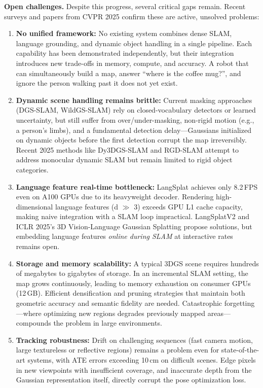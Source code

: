 \documentclass[10pt,twocolumn,letterpaper]{article}
\begin{document}
\textbf{Open challenges.} Despite this progress, several critical gaps remain. Recent surveys \cite{tosi2025survey, ding2025survey} and papers from CVPR 2025 confirm these are active, unsolved problems:
\begin{enumerate}
    \item \textbf{No unified framework:} No existing system combines dense SLAM, language grounding, and dynamic object handling in a single pipeline. Each capability has been demonstrated independently, but their integration introduces new trade-offs in memory, compute, and accuracy. A robot that can simultaneously build a map, answer ``where is the coffee mug?'', and ignore the person walking past it does not yet exist.

    \item \textbf{Dynamic scene handling remains brittle:} Current masking approaches (DGS-SLAM, WildGS-SLAM) rely on closed-vocabulary detectors or learned uncertainty, but still suffer from over/under-masking, non-rigid motion (e.g., a person's limbs), and a fundamental detection delay---Gaussians initialized on dynamic objects before the first detection corrupt the map irreversibly. Recent 2025 methods like Dy3DGS-SLAM and RGD-SLAM attempt to address monocular dynamic SLAM but remain limited to rigid object categories.

    \item \textbf{Language feature real-time bottleneck:} LangSplat achieves only 8.2\,FPS even on A100 GPUs due to its heavyweight decoder. Rendering high-dimensional language features (d $\gg$ 3) exceeds GPU L1 cache capacity, making naive integration with a SLAM loop impractical. LangSplatV2 and ICLR 2025's 3D Vision-Language Gaussian Splatting propose solutions, but embedding language features \textit{online during SLAM} at interactive rates remains open.

    \item \textbf{Storage and memory scalability:} A typical 3DGS scene requires hundreds of megabytes to gigabytes of storage. In an incremental SLAM setting, the map grows continuously, leading to memory exhaustion on consumer GPUs (12\,GB). Efficient densification and pruning strategies that maintain both geometric accuracy and semantic fidelity are needed. Catastrophic forgetting---where optimizing new regions degrades previously mapped areas---compounds the problem in large environments.

    \item \textbf{Tracking robustness:} Drift on challenging sequences (fast camera motion, large textureless or reflective regions) remains a problem even for state-of-the-art systems, with ATE errors exceeding 10\,cm on difficult scenes. Edge pixels in new viewpoints with insufficient coverage, and inaccurate depth from the Gaussian representation itself, directly corrupt the pose optimization loss.
\end{enumerate}
\end{document}
